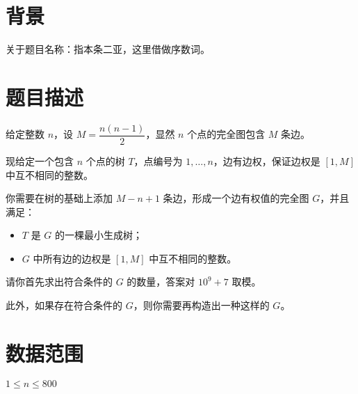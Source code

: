 \documentclass[a4paper,10pt]{article}
\begin{document}
\newpage

\section*{背景}

关于题目名称：指本条二亚，这里借做序数词。

\section*{题目描述}

给定整数 $n$，设 $M=\dfrac{n(n-1)}{2}$，显然 $n$ 个点的完全图包含 $M$ 条边。

现给定一个包含 $n$ 个点的树 $T$，点编号为 $1,\ldots,n$，边有边权，保证边权是 $[1,M]$ 中互不相同的整数。

你需要在树的基础上添加 $M-n+1$ 条边，形成一个边有权值的完全图 $G$，并且满足：

\begin{itemize}
\item $T$ 是 $G$ 的一棵最小生成树；

\item $G$ 中所有边的边权是 $[1,M]$ 中互不相同的整数。
\end{itemize}

请你首先求出符合条件的 $G$ 的数量，答案对 $10^9+7$ 取模。

此外，如果存在符合条件的 $G$，则你需要再构造出一种这样的 $G$。

\section*{数据范围}

$1\leq n\leq 800$

\newpage
\end{document}
